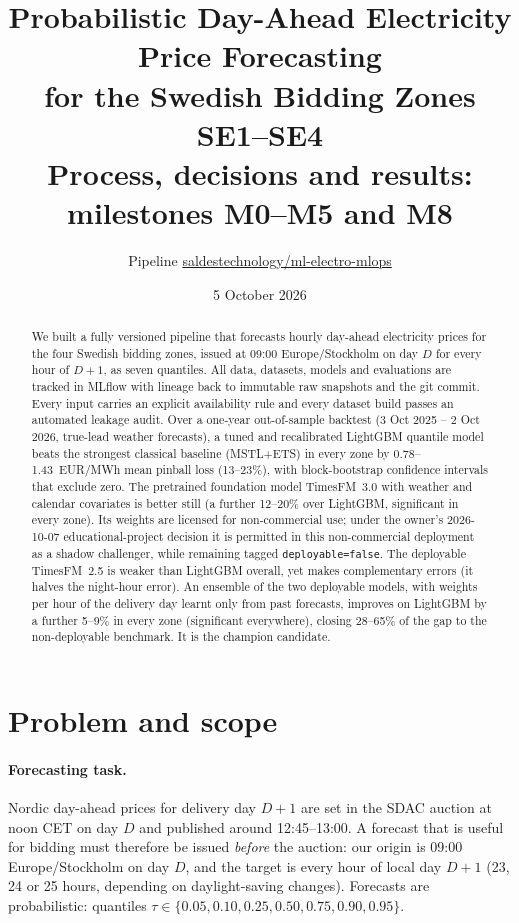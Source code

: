 \documentclass[11pt,a4paper]{article}
\title{Probabilistic Day-Ahead Electricity Price Forecasting\\for the Swedish Bidding Zones SE1--SE4\\[4pt]
\large Process, decisions and results: milestones M0--M5 and M8}
\author{Pipeline \code{pricefc} \quad\textperiodcentered\quad
\href{https://github.com/saldestechnology/ml-electro-mlops}{saldestechnology/ml-electro-mlops}}
\date{5 October 2026}
\newcommand{\code}[1]{\texttt{#1}}
\begin{document}
\maketitle

\begin{abstract}
\noindent
We built a fully versioned pipeline that forecasts hourly day-ahead electricity prices for the four
Swedish bidding zones, issued at 09:00 Europe/Stockholm on day $D$ for every hour of $D{+}1$, as
seven quantiles. All data, datasets, models and evaluations are tracked in MLflow with lineage back
to immutable raw snapshots and the git commit. Every input carries an explicit availability rule
and every dataset build passes an automated leakage audit. Over a one-year out-of-sample backtest
(3 Oct 2025 -- 2 Oct 2026, true-lead weather forecasts), a tuned and recalibrated LightGBM quantile
model beats the strongest classical baseline (MSTL+ETS) in every zone by 0.78--1.43~EUR/MWh mean
pinball loss (13--23\%), with block-bootstrap confidence intervals that exclude zero. The
pretrained foundation model TimesFM~3.0 with weather and calendar covariates is better still
(a further 12--20\% over LightGBM, significant in every zone). Its weights are licensed for
non-commercial use; under the owner's 2026-10-07 educational-project decision it is permitted in
this non-commercial deployment as a shadow challenger, while remaining tagged
\code{deployable=false}. The
deployable TimesFM~2.5 is weaker than LightGBM overall, yet makes complementary errors (it halves
the night-hour error). An ensemble of the two deployable models, with weights per hour of the
delivery day learnt only from past forecasts, improves on LightGBM by a further 5--9\% in every
zone (significant everywhere), closing 28--65\% of the gap to the non-deployable benchmark. It is
the champion candidate.
\end{abstract}

\tableofcontents

\section{Problem and scope}

\paragraph{Forecasting task.}
Nordic day-ahead prices for delivery day $D{+}1$ are set in the SDAC auction at noon CET on day
$D$ and published around 12:45--13:00. A forecast that is useful for bidding must therefore be
issued \emph{before} the auction: our origin is 09:00 Europe/Stockholm on day $D$, and the target
is every hour of local day $D{+}1$ (23, 24 or 25 hours, depending on daylight-saving changes).
Forecasts are probabilistic: quantiles $\tau \in \{0.05, 0.10, 0.25, 0.50, 0.75, 0.90, 0.95\}$.
\end{document}
